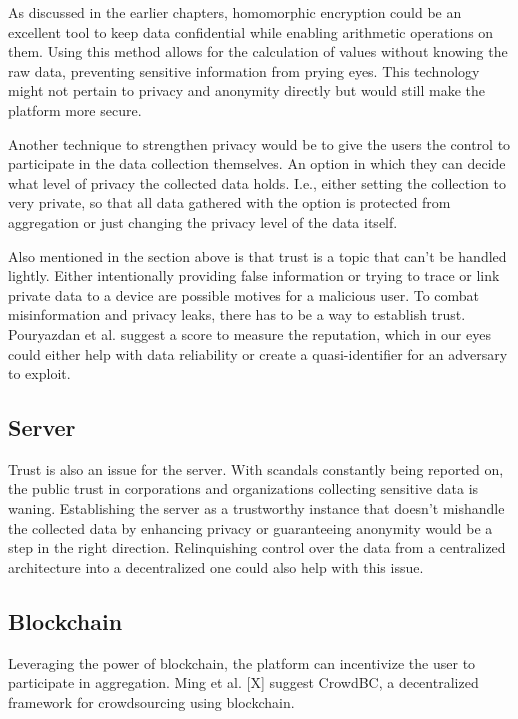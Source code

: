As discussed in the earlier chapters, homomorphic encryption could be an excellent tool to keep data confidential while enabling arithmetic operations on them. Using this method allows for the calculation of values without knowing the raw data, preventing sensitive information from prying eyes. This technology might not pertain to privacy and anonymity directly but would still make the platform more secure.

Another technique to strengthen privacy would be to give the users the control to participate in the data collection themselves. An option in which they can decide what level of privacy the collected data holds. I.e., either setting the collection to very private, so that all data gathered with the option is protected from aggregation or just changing the privacy level of the data itself.

Also mentioned in the section above is that trust is a topic that can't be handled lightly. Either intentionally providing false information or trying to trace or link private data to a device are possible motives for a malicious user. To combat misinformation and privacy leaks, there has to be a way to establish trust. Pouryazdan et al. suggest a score to measure the reputation, which in our eyes could either help with data reliability or create a quasi-identifier for an adversary to exploit.

\subsection{Server}
Trust is also an issue for the server. With scandals constantly being reported on, the public trust in corporations and organizations collecting sensitive data is waning. Establishing the server as a trustworthy instance that doesn't mishandle the collected data by enhancing privacy or guaranteeing anonymity would be a step in the right direction. Relinquishing control over the data from a centralized architecture into a decentralized one could also help with this issue.

\subsection{Blockchain}
Leveraging the power of blockchain, the platform can incentivize the user to participate in aggregation. Ming et al. [X] suggest CrowdBC, a decentralized framework for crowdsourcing using blockchain. 


